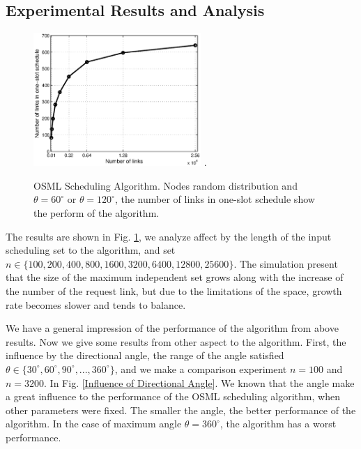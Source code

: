 \documentclass[conference]{IEEEtran}
\begin{document}
\subsection{Experimental Results and Analysis}


\begin{figure}[htpb]
\centering
\includegraphics[width=2.5in]{image/1.eps}
\DeclareGraphicsExtensions.
\caption{OSML Scheduling Algorithm. Nodes random distribution and $\theta = 60^{\circ} $ or $\theta = 120^{\circ}$, the number of links in one-slot schedule show the perform of the algorithm.}
\label{OSML Scheduling Algorithm.}
\end{figure}

The results are shown in Fig. \ref{OSML Scheduling Algorithm.}, we analyze affect by the length of the input scheduling set to the algorithm, and set $n \in \{100,200,400,800,1600,3200,6400,12800,25600\}$. The simulation present that the size of the maximum independent set grows along with the increase of the number of the request link, but due to the limitations of the space, growth rate becomes slower and tends to balance.

We have a general impression of the performance of the algorithm from above results. Now we give some results from other aspect to the algorithm. First, the influence by the directional angle, the range of the angle satisfied $\theta \in \{30^{\circ},60^{\circ},90^{\circ},...,360^{\circ}\}$, and we make a comparison experiment $n=100$ and $n=3200$. In Fig. \ref{Influence of Directional Angle}. We known that the angle make a great influence to the performance of the OSML scheduling algorithm, when other parameters were fixed. The smaller the angle, the better performance of the algorithm. In the case of maximum angle $\theta = 360^{\circ}$, the algorithm has a worst performance.
\end{document}
